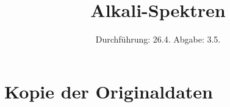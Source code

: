 

\subject{V605}
\title{Alkali-Spektren}
\date{
  Durchführung: 26.4.
  \hspace{3em}
  Abgabe: 3.5.
}



\maketitle
\thispagestyle{empty}
\tableofcontents
\newpage






\printbibliography

\appendix
\section{Kopie der Originaldaten}


